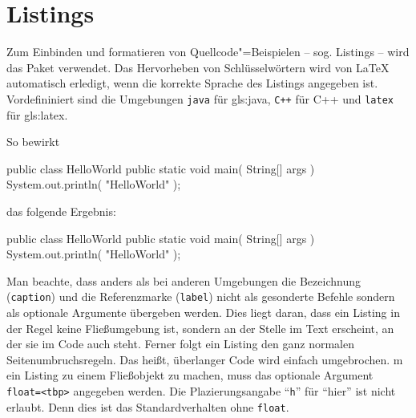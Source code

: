 \section{Listings}%
\label{sec:Listings}
%
Zum Einbinden und formatieren von Quellcode"=Beispielen
-- sog. Listings -- wird das Paket 
\parencite{Hoffmann2014} verwendet.
Das Hervorheben von Schlüsselwörtern
wird von LaTeX automatisch erledigt,
wenn die korrekte Sprache des Listings angegeben ist.
Vordefininiert sind die Umgebungen \texttt{java} für \gls{gls:java},
\texttt{C++} für C++ und \texttt{latex} für \gls{gls:latex}.

So bewirkt
%
\begin{latex}[%
  caption={Listing-Beispiel},%
  label={lst:listing}]
\begin{java}[caption={A Java Hello-World example},label={lst:hello-world}]
public class HelloWorld {
  public static void main( String[] args ) {
    System.out.println( "HelloWorld" );
  }
}
\end{java}
\end{latex}
%
das folgende Ergebnis:
%
\begin{java}[caption={A Java Hello-World example},label={lst:hello-world}]
public class HelloWorld {
  public static void main( String[] args ) {
    System.out.println( "HelloWorld" );
  }
}
\end{java}

Man beachte, dass anders als bei anderen Umgebungen
die Bezeichnung (\texttt{caption}) und die Referenzmarke (\texttt{label})
nicht als gesonderte Befehle sondern als optionale Argumente übergeben werden.
Dies liegt daran, dass ein Listing in der Regel keine Fließumgebung ist,
sondern an der Stelle im Text erscheint, an der sie im Code auch steht.
Ferner folgt ein Listing den ganz normalen Seitenumbruchsregeln.
Das heißt, überlanger Code wird einfach umgebrochen. 
m ein Listing zu einem Fließobjekt zu machen, muss das optionale Argument
\texttt{float=<tbp>} angegeben werden.
Die Plazierungsangabe \enquote{\texttt{h}} für \enquote{hier}
ist nicht erlaubt. Denn dies ist das Standardverhalten ohne \texttt{float}.